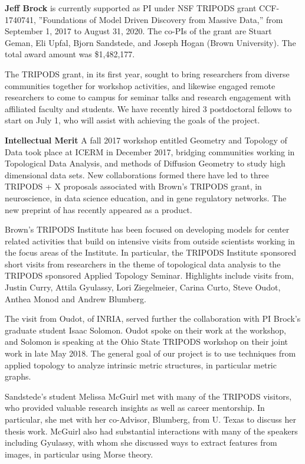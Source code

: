 

\textbf{Jeff Brock} is currently supported as PI under NSF TRIPODS grant CCF-1740741, ''Foundations of Model Driven Discovery from Massive Data,'' from September 1, 2017 to August 31, 2020. The co-PIs of the grant are Stuart Geman, Eli Upfal, Bjorn Sandstede, and Joseph Hogan (Brown University). The total award amount was \$1,482,177.

The TRIPODS grant, in its first year, sought to bring researchers from diverse communities together for workshop activities, and likewise engaged remote researchers to come to campus for seminar talks and research engagement with affiliated faculty and students. We have recently hired 3 postdoctoral fellows to start on July 1, who will assist with achieving the goals of the project.

\textbf{Intellectual Merit} A fall 2017 workshop entitled Geometry and Topology of Data took place at ICERM in December 2017, bridging communities working in Topological Data Analysis, and methods of Diffusion Geometry to study high dimensional data sets. New collaborations formed there have led to three  TRIPODS + X proposals associated with Brown's TRIPODS grant, in neuroscience, in data science education, and in gene regulatory networks. The new preprint \citep{Oudot:Solomon:persistence} of has recently appeared as a product.

Brown's TRIPODS Institute has been focused on developing models for center related activities that build on intensive visits from outside scientists working in the focus areas of the Institute. In particular, the TRIPODS Institute sponsored short visits from researchers in the theme of topological data analysis to the TRIPODS sponsored Applied Topology Seminar. Highlights include visits from, Justin Curry, Attila Gyulassy, Lori Ziegelmeier, Carina Curto, Steve Oudot, Anthea Monod and Andrew Blumberg.

The visit from Oudot, of INRIA, served further the collaboration with PI Brock's graduate student Isaac Solomon. Oudot spoke on their work at the workshop, and Solomon is speaking at the Ohio State TRIPODS workshop on their joint work in late May 2018. The general goal of our project is to use techniques from applied topology to analyze intrinsic metric structures, in particular metric graphs.

Sandstede's student Melissa McGuirl met with many of the TRIPODS visitors, who provided valuable research insights as well as career mentorship. In particular, she met with her co-Advisor, Blumberg, from U. Texas to discuss her thesis work. McGuirl also had substantial interactions with many of the speakers including Gyulassy, with whom she discussed ways to extract features from images, in particular using Morse theory. 

